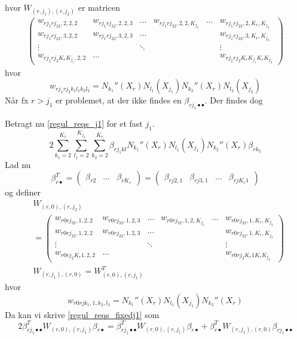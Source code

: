 \documentclass[a4paper, 12pt]{memoir}
\begin{document}
hvor $W_{(r,j_1), (r,j_2)}$ er matricen
\begin{align}
\begin{pmatrix}
w_{rj_1rj_22,2,2,2} & w_{rj_1rj_22,2,2,3}& \dots & w_{rj_1rj_22,2,2,K_{j_2}}  &\dots &w_{rj_1rj_22,2,K_r,K_{j_2}}\\
w_{rj_1rj_22,3,2,2} &  w_{rj_1rj_22,3,2,3} & \dots &&&w_{rj_1rj_22,3,K_r,K_{j_2}}\\
\vdots &&\ddots &&&\vdots\\
w_{rj_1rj_2K_rK_{j_1},2,2}&\dots &&&&w_{rj_1rj_2K_rK_{j_1}K_rK_{j_2}}
\end{pmatrix}
\end{align}
hvor 
\begin{equation}
w_{rj_1rj_2k_1l_1k_2l_2}=N_{k_1}''(X_r)N_{l_1}(X_{j_1})  N_{k_2}''(X_r)N_{l_2}(X_{j_2})
\end{equation}
Når fx $r>j_1$ er problemet, at der ikke findes en $\beta_{rj_1\bullet\bullet}$. Der findes dog 


Betragt nu \eqref{regul_reqs_j1} for et fast $j_1$. 
\begin{equation}
2 \sum_{k_1=2}^{K_r}\sum_{l_1=2}^{K_{j_1}}\sum_{k_2=2}^{K_r} \beta_{rj_1kl} N_{k_1}''(X_r)N_{l_1}(X_{j_1})N_{k_2}''(X_r) \beta_{rk_2}\label{regul_reqs_fixedj1}
\end{equation}
Lad nu 
\begin{equation}
\beta_{r\bullet}^T=\begin{pmatrix}
\beta_{r2} &\dots & \beta_{rK_r}
\end{pmatrix}=\begin{pmatrix}
\beta_{rj2,1} &\beta_{rj3,1} & \dots & \beta_{rjK_r1}
\end{pmatrix}
\end{equation}
og definer
\begin{align}
&W_{(r,0), (r,j_2)}\nonumber\\
&=\begin{pmatrix}
w_{r0rj_22,1,2,2} & w_{r0rj_22,1,2,3}& \dots & w_{r0rj_22,1,2,K_{j_2}}  &\dots &w_{r0rj_22,1,K_r,K_{j_2}}\\
w_{r0rj_23,1,2,2} &  w_{r0rj_22,1,2,3} & \dots &&&w_{r0rj_22,1,K_r,K_{j_2}}\\
\vdots &&\ddots &&&\vdots\\
w_{r0rj_2K_r1,2,2}&\dots &&&&w_{r0rj_2K_r1K_rK_{j_2}}
\end{pmatrix}\\
&W_{(r,j_1),(r,0)}=W_{(r,0), (r,j_1)}^T
\end{align}
hvor 
\begin{equation}
w_{r0rjk_1,1,k_2,l_2}=N_{k_1}''(X_r)N_{l_1}(X_{j_1})N_{k_2}''(X_r)
\end{equation}
Da kan vi skrive \eqref{regul_reqs_fixedj1} som
\begin{equation}
2\beta_{rj_1\bullet\bullet}^T W_{(r,0),(r,j_1)} \beta_{r\bullet}=\beta_{rj_1\bullet\bullet}^TW_{(r,0),(r,j_1)}\beta_{r\bullet}+\beta_{r\bullet}^T W_{(r,j_1),(r,0)}\beta_{rj_1\bullet\bullet}
\end{equation}
\end{document}
